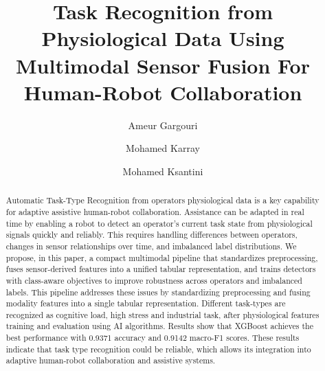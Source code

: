 \documentclass{llncs}
\begin{document}
\title{Task Recognition from Physiological Data Using Multimodal Sensor Fusion For Human-Robot Collaboration}

\author{Ameur Gargouri \and Mohamed Karray \and Mohamed Ksantini}

\maketitle

\begin{abstract}
Automatic Task-Type Recognition from operators physiological data is a key capability for adaptive assistive human-robot collaboration.
Assistance can be adapted in real time by enabling a robot to detect an operator's current task state from physiological signals quickly and reliably.
This requires handling differences between operators, changes in sensor relationships over time, and imbalanced label distributions.
We propose, in this paper, a compact multimodal pipeline that standardizes preprocessing, fuses sensor-derived features into a unified tabular representation, and trains detectors with class-aware objectives to improve robustness across operators and imbalanced labels.
This pipeline addresses these issues by standardizing preprocessing and fusing modality features into a single tabular representation.
Different task-types are recognized as cognitive load, high stress and industrial task, after physiological features training and evaluation using \ac{AI} algorithms.
Results show that \ac{XGBoost} achieves the best performance with 0.9371 accuracy and 0.9142 macro-F1 scores. 
These results indicate that task type recognition could be reliable, which allows its integration into adaptive human-robot collaboration and assistive systems.
\end{abstract}
\end{document}

